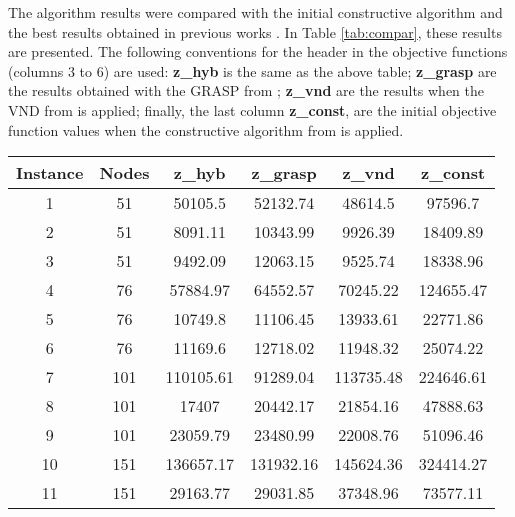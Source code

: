 \documentclass[10pt,twoside]{article}
\begin{document}
The algorithm results were compared with the initial constructive algorithm \citep{constr} and the best results obtained in previous works \citep{ls,random}. In Table \ref{tab:compar}, these results are presented. The following conventions for the header in the objective functions (columns 3 to 6) are used: \textbf{z\_hyb} is the same as the above table; \textbf{z\_grasp} are the results obtained with the GRASP from \citep{random}; \textbf{z\_vnd} are the results when the VND from \cite{ls} is applied; finally, the last column \textbf{z\_const}, are the initial objective function values when the constructive algorithm from \cite{constr} is applied.
\begin{table}
\centering
\begin{tabular}{cccccc}
\hline
\textbf{Instance} & \textbf{Nodes} & \textbf{z\_hyb} & \textbf{z\_grasp} & \textbf{z\_vnd} & \textbf{z\_const} \\ \hline
1                 & 51             & 50105.5         & 52132.74          & 48614.5         & 97596.7           \\
2                 & 51             & 8091.11         & 10343.99          & 9926.39         & 18409.89          \\
3                 & 51             & 9492.09         & 12063.15          & 9525.74         & 18338.96          \\
4                 & 76             & 57884.97        & 64552.57          & 70245.22        & 124655.47         \\
5                 & 76             & 10749.8         & 11106.45          & 13933.61        & 22771.86          \\
6                 & 76             & 11169.6         & 12718.02          & 11948.32        & 25074.22          \\
7                 & 101            & 110105.61       & 91289.04          & 113735.48       & 224646.61         \\
8                 & 101            & 17407           & 20442.17          & 21854.16        & 47888.63          \\
9                 & 101            & 23059.79        & 23480.99          & 22008.76        & 51096.46          \\
10                & 151            & 136657.17       & 131932.16         & 145624.36       & 324414.27         \\
11                & 151            & 29163.77        & 29031.85          & 37348.96        & 73577.11          \\

\end{tabular}
\end{table}
\end{document}
